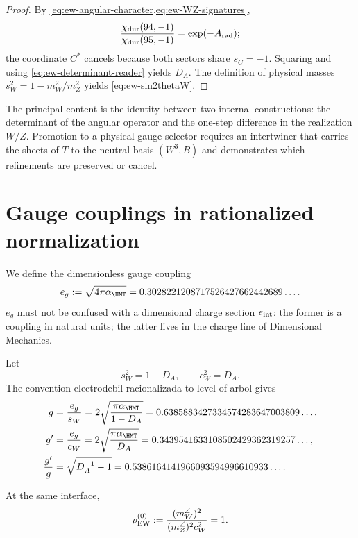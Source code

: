 \begin{proof}
By \cref{eq:ew-angular-character,eq:ew-WZ-signatures},
\[
\frac{\chi_{\rm dur}(94,-1)}{\chi_{\rm dur}(95,-1)}
=\exp(-A_{\rm rad});
\]
the coordinate \(C^*\) cancels because both sectors share
\(s_C=-1\). Squaring and using
\cref{eq:ew-determinant-reader} yields \(D_A\). The definition
of physical masses \(s_W^2=1-m_W^2/m_Z^2\) yields
\cref{eq:ew-sin2thetaW}.
\end{proof}

The principal content is the identity between two internal constructions: the determinant of the angular operator and the one-step difference in the realization \(W/Z\). Promotion to a physical gauge selector requires an intertwiner that carries the sheets of \(T\) to the neutral basis \((W^3,B)\) and demonstrates which refinements are preserved or cancel.

\section{Gauge couplings in rationalized normalization}

We define the dimensionless gauge coupling
\begin{equation}
\label{eq:ew-egauge}
e_g:=\sqrt{4\pi\alpha_{\HMT}}
=0.3028221208717526427662442689\ldots .
\end{equation}
\(e_g\) must not be confused with a dimensional charge section
\(e_{\rm int}\): the former is a coupling in natural units; the
latter lives in the charge line of Dimensional Mechanics.

Let
\begin{equation}
\label{eq:ew-sw-cw}
s_W^2=1-D_A,
\qquad
c_W^2=D_A.
\end{equation}
The convention electrodebil racionalizada to level of arbol gives
\begin{align}
g&=\frac{e_g}{s_W}
=2\sqrt{\frac{\pi\alpha_{\HMT}}{1-D_A}}
=0.6385883427334574283647003809\ldots,
\label{eq:ew-g}\\
g'&=\frac{e_g}{c_W}
=2\sqrt{\frac{\pi\alpha_{\HMT}}{D_A}}
=0.3439541633108502429362319257\ldots,
\label{eq:ew-gprime}\\
\frac{g'}{g}
&=\sqrt{D_A^{-1}-1}
=0.5386164141966093594996610933\ldots .
\label{eq:ew-gprime-over-g}
\end{align}

\begin{proposition}
\label{prop:ew-rho}
At the same interface,
\begin{equation}
\label{eq:ew-rho}
\rho_{\rm EW}^{(0)}
:=\frac{(m_W^{\angle})^2}
{(m_Z^{\angle})^2c_W^2}=1.
\end{equation}
\end{proposition}

